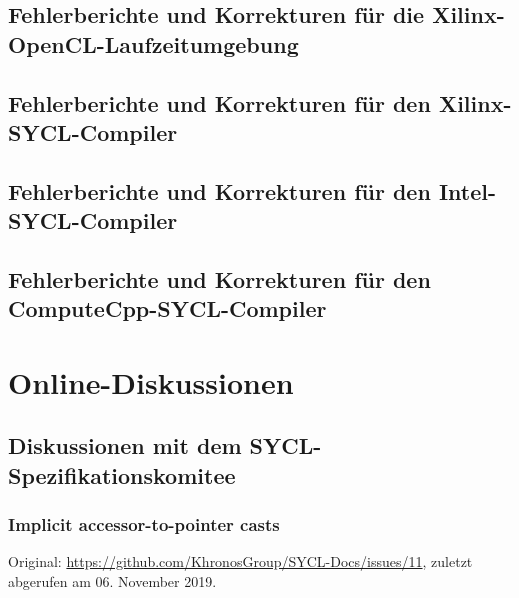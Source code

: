 \section{Fehlerberichte und Korrekturen für die Xilinx-OpenCL-Laufzeitumgebung}
\label{anhang:fehler:xrt}

\section{Fehlerberichte und Korrekturen für den Xilinx-SYCL-Compiler}
\label{anhang:fehler:xilinx}

\section{Fehlerberichte und Korrekturen für den Intel-SYCL-Compiler}
\label{anhang:fehler:intel}

\section{Fehlerberichte und Korrekturen für den ComputeCpp-SYCL-Compiler}
\label{anhang:fehler:computecpp}

\chapter{Online-Diskussionen}\label{anhang:diskussionen}

\section{Diskussionen mit dem SYCL-Spezifikationskomitee}
\label{anhang:diskussionen:syclspec}

\subsection{Implicit accessor-to-pointer casts}
\label{anhang:diskussion:syclspec:implicitaccessor}

Original: \url{https://github.com/KhronosGroup/SYCL-Docs/issues/11}, zuletzt
abgerufen am 06. November 2019.

